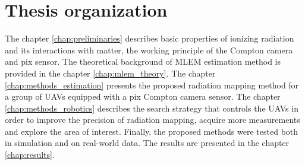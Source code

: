 \section{Thesis organization}
The chapter \ref{chap:preliminaries} describes basic properties of ionizing radiation and its interactions with matter, the working principle of the Compton camera and \ac{pix} sensor.
The theoretical background of \ac{MLEM} estimation method is provided in the chapter \ref{chap:mlem_theory}.
The chapter \ref{chap:methods_estimation} presents the proposed radiation mapping method for a group of \ac{UAV}s equipped with a \ac{pix} Compton camera sensor.
The chapter \ref{chap:methods_robotics} describes the search strategy that controls the \ac{UAV}s in order to improve the precision of radiation mapping, acquire more measurements and explore the area of interest. 
Finally, the proposed methods were tested both in simulation and on real-world data. 
The results are presented in the chapter \ref{chap:results}.


